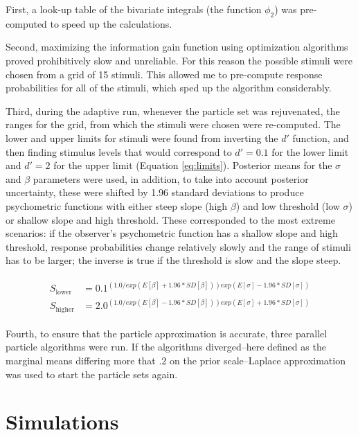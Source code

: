 \documentclass{article}\usepackage{knitr}
\begin{document}
First, a look-up table of the bivariate integrals (the function $\phi_2$) was pre-computed to speed up the calculations. 

Second, maximizing the information gain function using optimization algorithms proved prohibitively slow and unreliable. For this reason the possible stimuli were chosen from a grid of 15 stimuli. This allowed me to pre-compute response probabilities for all of the stimuli, which sped up the algorithm considerably. 

Third, during the adaptive run, whenever the particle set was rejuvenated, the ranges for the grid, from which the stimuli were chosen were re-computed. The lower and upper limits for stimuli were found from inverting the $d'$ function, and then finding stimulus levels that would correspond to $d' = 0.1$ for the lower limit and $d' = 2$ for the upper limit (Equation \ref{eq:limits}). Posterior means for the $\sigma$ and $\beta$ parameters were used, in addition, to take into account posterior uncertainty, these were shifted by 1.96 standard deviations to produce psychometric functions with either steep slope (high $\beta$) and low threshold (low $\sigma$) or shallow slope and high threshold. These corresponded to the most extreme scenarios: if the observer's psychometric function has a shallow slope and high threshold, response probabilities change relatively slowly and the range of stimuli has to be larger; the inverse is true if the threshold is slow and the slope steep. 

\begin{align}
\begin{split}
\label{eq:limits}
S_{\text{lower}} &= 0.1^{(1.0 / exp(E[\beta] + 1.96 * SD[\beta])) exp(E[\sigma] - 1.96 * SD[\sigma])}
\\ 
S_{\text{higher}} &= 2.0^ {(1.0 / exp(E[\beta] - 1.96 * SD[\beta])) exp(E[\sigma] + 1.96 * SD[\sigma])}
\end{split}
\end{align}

Fourth, to ensure that the particle approximation is accurate, three parallel particle algorithms were run. If the algorithms diverged--here defined as the marginal means differing more that $.2$ on the prior scale--Laplace approximation was used to start the particle sets again.

\newpage


\section{Simulations}
\label{sec:simulations}
\end{document}
